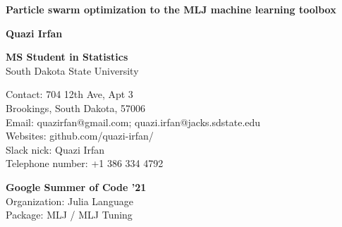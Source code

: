 \begin{titlepage}
    \begin{center}
        \vspace*{1cm}
        
        \Large
        \textbf{Particle swarm optimization to the MLJ machine learning toolbox}
        
        \vspace{0.25cm}
        
        \vspace{0.5cm}
        
        
        \vspace{1.5cm}
        
        \Large
        \textbf{Quazi Irfan\\}
    
        \vspace{2cm}
        
        \small
        \begin{multicols}{2}
        \begin{flushleft}
        \textbf{MS Student in Statistics} \\
        South Dakota State University
        
        Contact: 704 12th Ave, Apt 3 \\
        Brookings, South Dakota, 57006 \\
        
        Email: quazirfan@gmail.com; quazi.irfan@jacks.sdstate.edu\\
        Websites: github.com/quazi-irfan/ \\
        Slack nick: Quazi Irfan \\
        Telephone number: +1 386 334 4792
        \end{flushleft}
        
        \vspace{0.8cm}
        
        \columnbreak
        \begin{flushleft}
        \textbf{Google Summer of Code '21} \\
        Organization: Julia Language \\
        Package: MLJ / MLJ Tuning 
        \end{flushleft}
        \end{multicols}
    \end{center}
\end{titlepage}